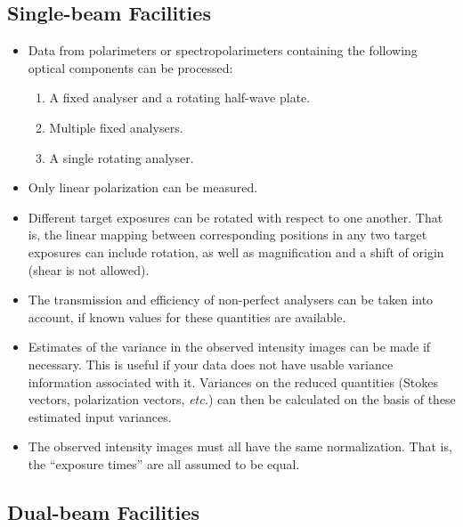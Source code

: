\documentclass[twoside,11pt]{starlink}
\begin{document}
\subsection{Single-beam Facilities}

\begin{itemize}

\item Data from polarimeters or spectropolarimeters containing the following
optical components can be processed:

\begin{enumerate}
\item A fixed analyser and a rotating half-wave plate.
\item Multiple fixed analysers.
\item A single rotating analyser.
\end{enumerate}

\item Only linear polarization can be measured.

\item Different target exposures can be rotated with respect to one
another. That is, the linear mapping between corresponding positions in
any two target
exposures can include rotation, as well as magnification and a shift of
origin (shear is not allowed).

\item The transmission and efficiency of non-perfect analysers can be
taken into account, if known values for these quantities are available.

\item Estimates of the variance in the observed intensity images can be made
if necessary. This is useful if your data does not have usable variance
information associated with it. Variances on the reduced quantities
(Stokes vectors, polarization vectors, \emph{etc.}) can then be calculated
on the basis of these estimated input variances.

\item The observed intensity images must all have the same normalization.
That is, the ``exposure times'' are all assumed to be equal.

\end{itemize}

\subsection{Dual-beam Facilities}
\end{document}
